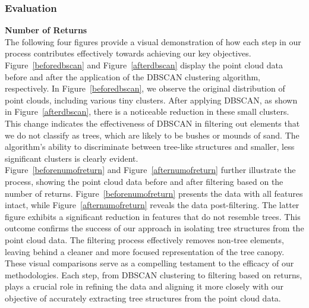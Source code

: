 \documentclass{article}
\begin{document}
\subsubsection{Evaluation}
\noindent \textbf{Number of Returns}\\
\noindent The following four figures provide a visual demonstration of how each step in our process contributes effectively towards achieving our key objectives. Figure~\ref{beforedbscan} and Figure~\ref{afterdbscan} display the point cloud data before and after the application of the DBSCAN clustering algorithm, respectively. In Figure~\ref{beforedbscan}, we observe the original distribution of point clouds, including various tiny clusters. After applying DBSCAN, as shown in Figure~\ref{afterdbscan}, there is a noticeable reduction in these small clusters. This change indicates the effectiveness of DBSCAN in filtering out elements that we do not classify as trees, which are likely to be bushes or mounds of sand. The algorithm's ability to discriminate between tree-like structures and smaller, less significant clusters is clearly evident.\\

\noindent Figure~\ref{beforenumofreturn} and Figure~\ref{afternumofreturn} further illustrate the process, showing the point cloud data before and after filtering based on the number of returns. Figure~\ref{beforenumofreturn} presents the data with all features intact, while Figure~\ref{afternumofreturn} reveals the data post-filtering. The latter figure exhibits a significant reduction in features that do not resemble trees. This outcome confirms the success of our approach in isolating tree structures from the point cloud data. The filtering process effectively removes non-tree elements, leaving behind a cleaner and more focused representation of the tree canopy.\\

\noindent These visual comparisons serve as a compelling testament to the efficacy of our methodologies. Each step, from DBSCAN clustering to filtering based on returns, plays a crucial role in refining the data and aligning it more closely with our objective of accurately extracting tree structures from the point cloud data.\\
\end{document}
